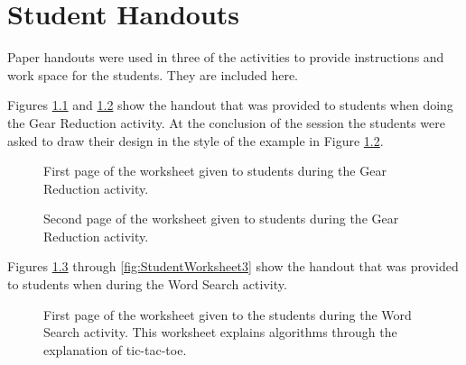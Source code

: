 \chapter{Student Handouts}

Paper handouts were used in three of the activities to provide instructions and work space for the students. They are included here.


	\label{sec:gearshandout}
	
	Figures \ref{fig:gearshandout1} and \ref{fig:gearshandout2} show the handout that was provided to students when doing the Gear Reduction activity. At the conclusion of the session the students were asked to draw their design in the style of the example in Figure \ref{fig:gearshandout2}.
	
	
	\begin{figure}
	\centering
	\caption{First page of the worksheet given to students during the Gear Reduction activity.}
	\label{fig:gearshandout1}
	\end{figure}

	\begin{figure}
	\centering
	\caption{Second page of the worksheet given to students during the Gear Reduction activity.}
	\label{fig:gearshandout2}
	\end{figure}

	\label{sec:wordsearchhandout}
	Figures \ref{fig:StudentWorksheet1} through \ref{fig:StudentWorksheet3} show the handout that was provided to students when during the Word Search activity.
	

\begin{figure}%
   \centering
   \caption{First page of the worksheet given to the students during the Word Search activity. This worksheet explains algorithms through the explanation of tic-tac-toe.}
   \label{fig:StudentWorksheet1}
\end{figure}
	
